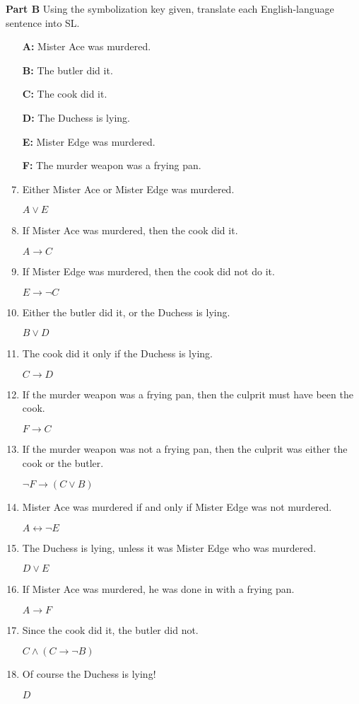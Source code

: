 \documentclass[12pt, letterpaper, twoside]{article}
\begin{document}
\noindent \textbf{Part B} Using the symbolization key given,
translate each English-language sentence into SL.
\begin{enumerate}
	\item[\textbf{A:}] Mister Ace was murdered.
	\item[\textbf{B:}] The butler did it.
	\item[\textbf{C:}] The cook did it.
	\item[\textbf{D:}] The Duchess is lying.
	\item[\textbf{E:}] Mister Edge was murdered.
	\item[\textbf{F:}] The murder weapon was a frying
          pan.
	
	\item Either Mister Ace or Mister Edge was murdered.

	$A \vee E$

	\item If Mister Ace was murdered, then the cook did
          it.

	$A \rightarrow C$

	\item If Mister Edge was murdered, then the cook did
          not do it.

	$E \rightarrow \neg C$

	\item Either the butler did it, or the Duchess is
          lying.

	$B \vee D$

	\item The cook did it only if the Duchess is lying.

	$C \rightarrow D$

	\item If the murder weapon was a frying pan, then
          the culprit must have been the cook.

	$F \rightarrow C$

	\item If the murder weapon was not a frying pan,
          then the culprit was either the cook or the
          butler.

	$\neg F \rightarrow (C \vee B)$

	\item Mister Ace was murdered if and only if Mister
          Edge was not murdered.

	$A \leftrightarrow \neg E$

	\item The Duchess is lying, unless it was Mister
          Edge who was murdered.

	$D \vee E$

	\item If Mister Ace was murdered, he was done in
          with a frying pan.

	$A \rightarrow F$

	\item Since the cook did it, the butler did not.

	$C \wedge (C \rightarrow \neg B)$

	\item Of course the Duchess is lying!

	$D$
\end{enumerate}
\end{document}
